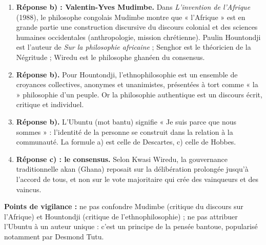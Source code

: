 \documentclass[11pt]{article}
\newcommand{\cle}[1]{{\popxbold\color{popdark}#1}}
\begin{document}
\begin{corrige}
\begin{enumerate}
\item \textbf{Réponse b) : Valentin-Yves Mudimbe.} Dans \emph{L'invention de l'Afrique} (1988), le philosophe congolais Mudimbe montre que « l'Afrique » est en grande partie une construction discursive du discours colonial et des sciences humaines occidentales (anthropologie, mission chrétienne). Paulin Hountondji est l'auteur de \emph{Sur la philosophie africaine} ; Senghor est le théoricien de la Négritude ; Wiredu est le philosophe ghanéen du consensus.
\item \textbf{Réponse b).} Pour Hountondji, l'ethnophilosophie est un ensemble de croyances collectives, anonymes et unanimistes, présentées à tort comme « la » philosophie d'un peuple. Or la philosophie authentique est un discours écrit, critique et individuel.
\item \textbf{Réponse b).} L'\cle{Ubuntu} (mot bantu) signifie « Je suis parce que nous sommes » : l'identité de la personne se construit dans la relation à la communauté. La formule a) est celle de Descartes, c) celle de Hobbes.
\item \textbf{Réponse c) : le consensus.} Selon Kwasi Wiredu, la gouvernance traditionnelle akan (Ghana) reposait sur la délibération prolongée jusqu'à l'accord de tous, et non sur le vote majoritaire qui crée des vainqueurs et des vaincus.
\end{enumerate}
\textbf{Points de vigilance :} ne pas confondre Mudimbe (critique du discours sur l'Afrique) et Hountondji (critique de l'ethnophilosophie) ; ne pas attribuer l'Ubuntu à un auteur unique : c'est un principe de la pensée bantoue, popularisé notamment par Desmond Tutu.
\end{corrige}
\end{document}
